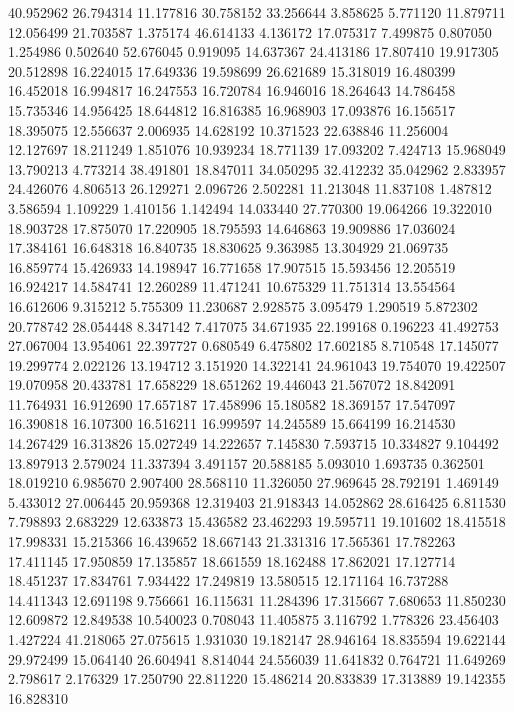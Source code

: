 40.952962
26.794314
11.177816
30.758152
33.256644
3.858625
5.771120
11.879711
12.056499
21.703587
1.375174
46.614133
4.136172
17.075317
7.499875
0.807050
1.254986
0.502640
52.676045
0.919095
14.637367
24.413186
17.807410
19.917305
20.512898
16.224015
17.649336
19.598699
26.621689
15.318019
16.480399
16.452018
16.994817
16.247553
16.720784
16.946016
18.264643
14.786458
15.735346
14.956425
18.644812
16.816385
16.968903
17.093876
16.156517
18.395075
12.556637
2.006935
14.628192
10.371523
22.638846
11.256004
12.127697
18.211249
1.851076
10.939234
18.771139
17.093202
7.424713
15.968049
13.790213
4.773214
38.491801
18.847011
34.050295
32.412232
35.042962
2.833957
24.426076
4.806513
26.129271
2.096726
2.502281
11.213048
11.837108
1.487812
3.586594
1.109229
1.410156
1.142494
14.033440
27.770300
19.064266
19.322010
18.903728
17.875070
17.220905
18.795593
14.646863
19.909886
17.036024
17.384161
16.648318
16.840735
18.830625
9.363985
13.304929
21.069735
16.859774
15.426933
14.198947
16.771658
17.907515
15.593456
12.205519
16.924217
14.584741
12.260289
11.471241
10.675329
11.751314
13.554564
16.612606
9.315212
5.755309
11.230687
2.928575
3.095479
1.290519
5.872302
20.778742
28.054448
8.347142
7.417075
34.671935
22.199168
0.196223
41.492753
27.067004
13.954061
22.397727
0.680549
6.475802
17.602185
8.710548
17.145077
19.299774
2.022126
13.194712
3.151920
14.322141
24.961043
19.754070
19.422507
19.070958
20.433781
17.658229
18.651262
19.446043
21.567072
18.842091
11.764931
16.912690
17.657187
17.458996
15.180582
18.369157
17.547097
16.390818
16.107300
16.516211
16.999597
14.245589
15.664199
16.214530
14.267429
16.313826
15.027249
14.222657
7.145830
7.593715
10.334827
9.104492
13.897913
2.579024
11.337394
3.491157
20.588185
5.093010
1.693735
0.362501
18.019210
6.985670
2.907400
28.568110
11.326050
27.969645
28.792191
1.469149
5.433012
27.006445
20.959368
12.319403
21.918343
14.052862
28.616425
6.811530
7.798893
2.683229
12.633873
15.436582
23.462293
19.595711
19.101602
18.415518
17.998331
15.215366
16.439652
18.667143
21.331316
17.565361
17.782263
17.411145
17.950859
17.135857
18.661559
18.162488
17.862021
17.127714
18.451237
17.834761
7.934422
17.249819
13.580515
12.171164
16.737288
14.411343
12.691198
9.756661
16.115631
11.284396
17.315667
7.680653
11.850230
12.609872
12.849538
10.540023
0.708043
11.405875
3.116792
1.778326
23.456403
1.427224
41.218065
27.075615
1.931030
19.182147
28.946164
18.835594
19.622144
29.972499
15.064140
26.604941
8.814044
24.556039
11.641832
0.764721
11.649269
2.798617
2.176329
17.250790
22.811220
15.486214
20.833839
17.313889
19.142355
16.828310
